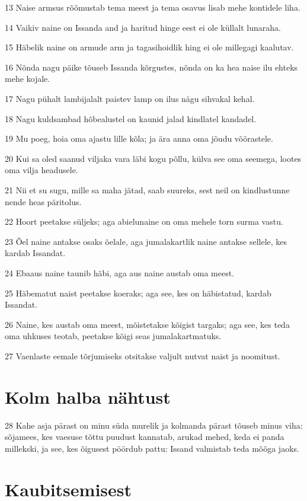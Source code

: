 \par 13 Naise armsus rõõmustab tema meest ja tema osavus lisab mehe kontidele liha.
\par 14 Vaikiv naine on Issanda and ja haritud hinge eest ei ole küllalt lunaraha.
\par 15 Häbelik naine on armude arm ja tagasihoidlik hing ei ole millegagi kaalutav.
\par 16 Nõnda nagu päike tõuseb Issanda kõrgustes, nõnda on ka hea naise ilu ehteks mehe kojale.
\par 17 Nagu pühalt lambijalalt paistev lamp on ilus nägu sihvakal kehal.
\par 18 Nagu kuldsambad hõbealustel on kaunid jalad kindlatel kandadel.
\par 19 Mu poeg, hoia oma ajastu lille kõla; ja ära anna oma jõudu võõrastele.
\par 20 Kui sa oled saanud viljaka vara läbi kogu põllu, külva see oma seemega, lootes oma vilja headusele.
\par 21 Nii et su sugu, mille sa maha jätad, saab suureks, sest neil on kindlustunne nende heas päritolus.
\par 22 Hoort peetakse süljeks; aga abielunaine on oma mehele torn surma vastu.
\par 23 Õel naine antakse osaks õelale, aga jumalakartlik naine antakse sellele, kes kardab Issandat.
\par 24 Ebaaus naine taunib häbi, aga aus naine austab oma meest.
\par 25 Häbematut naist peetakse koeraks; aga see, kes on häbistatud, kardab Issandat.
\par 26 Naine, kes austab oma meest, mõistetakse kõigist targaks; aga see, kes teda oma uhkuses teotab, peetakse kõigi seas jumalakartmatuks.
\par 27 Vaenlaste eemale tõrjumiseks otsitakse valjult nutvat naist ja noomitust.

\section*{Kolm halba nähtust}

\par 28 Kahe asja pärast on minu süda murelik ja kolmanda pärast tõuseb minus viha: sõjamees, kes vaesuse tõttu puudust kannatab, arukad mehed, keda ei panda millekski, ja see, kes õigusest pöördub pattu: Issand valmistab teda mõõga jaoks.

\section*{Kaubitsemisest}

